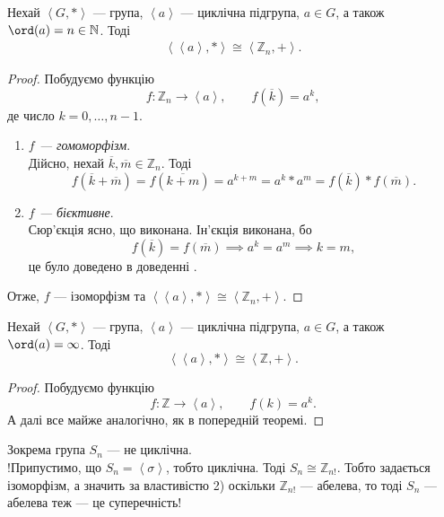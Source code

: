 \documentclass{math_library}
\begin{document}
\begin{theorem}
Нехай $\left<G,* \right>$ --- група, $\left<a\right>$ --- циклічна підгрупа, $a \in G$, а також $\ord(a) = n \in \mathbb{N}$. Тоді 
\begin{align*}
\left<\left<a\right>, *\right> \cong \left< \mathbb{Z}_n, + \right>.
\end{align*}
\end{theorem}

\begin{proof}
Побудуємо функцію 
\[ 
f \colon \mathbb{Z}_n \to \left<a\right>,\qquad f(\overline{k}) = a^k,
\] 
де число $k = 0,\dots,n-1$.
\begin{enumerate}[wide=0pt,label={\Roman*.}]
\item \textit{$f$ --- гомоморфізм}.\\
Дійсно, нехай $\overline{k}, \overline{m} \in \mathbb{Z}_n$. Тоді
\[
f(\overline{k}+\overline{m}) = f(\overline{k+m}) = a^{k+m} = a^k * a^m = f(\overline{k})*f(\overline{m}).
\]

\item \textit{$f$ --- бієктивне}.\\
Сюр'єкція ясно, що виконана. Ін'єкція виконана, бо 
\[
f(\overline{k}) = f(\overline{m}) \implies a^k = a^m \implies k = m,
\] 
це було доведено в доведенні . 
\end{enumerate}
Отже, $f$ --- ізоморфізм та $\left<\left<a\right>, *\right> \cong \left< \mathbb{Z}_n, + \right>$.
\end{proof}

\begin{theorem}
Нехай $\left<G,* \right>$ --- група, $\left<a\right>$ --- циклічна підгрупа, $a \in G$, а також $\ord(a) = \infty$. Тоді 
\[
\left<\left<a\right>, *\right> \cong \left< \mathbb{Z}, + \right>.
\]
\end{theorem}

\begin{proof}
Побудуємо функцію 
\[
f \colon \mathbb{Z} \to \left<a\right>, \qquad f(k) = a^k.
\]
А далі все майже аналогічно, як в попередній теоремі.
\end{proof}

\begin{example}
Зокрема група $S_n$ --- не циклічна.
\bigskip \\
!Припустимо, що $S_n = \left<\sigma\right>$, тобто циклічна. Тоді $S_n \cong \mathbb{Z}_{n!}$. Тобто задається ізоморфізм, а значить за властивістю 2) оскільки $\mathbb{Z}_{n!}$ --- абелева, то тоді $S_n$ --- абелева теж --- це суперечність!
\end{example}
\end{document}
